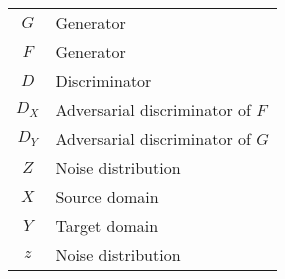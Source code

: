 

\begin{tabular}{cp{}}
  $G$ & Generator \\
  $F$ &  Generator \\
  $D$ & Discriminator \\
  $D_X$ & Adversarial discriminator of $F$ \\
  $D_Y$ & Adversarial discriminator of $G$ \\
  $Z$  & Noise distribution\\
  $X$  & Source domain\\
  $Y$  & Target domain\\
  $z$  & Noise distribution\\
\end{tabular}\\